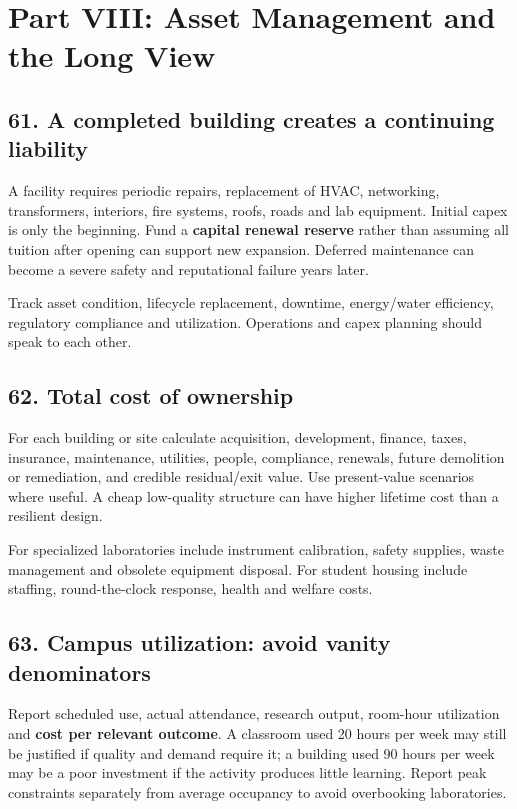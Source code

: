 \section*{Part VIII: Asset Management and the Long View}


\subsection{61. A completed building creates a continuing liability}

A facility requires periodic repairs, replacement of HVAC, networking, transformers, interiors, fire systems, roofs, roads and lab equipment. Initial capex is only the beginning. Fund a \textbf{capital renewal reserve} rather than assuming all tuition after opening can support new expansion. Deferred maintenance can become a severe safety and reputational failure years later.

Track asset condition, lifecycle replacement, downtime, energy/water efficiency, regulatory compliance and utilization. Operations and capex planning should speak to each other.


\subsection{62. Total cost of ownership}

For each building or site calculate acquisition, development, finance, taxes, insurance, maintenance, utilities, people, compliance, renewals, future demolition or remediation, and credible residual/exit value. Use present-value scenarios where useful. A cheap low-quality structure can have higher lifetime cost than a resilient design.

For specialized laboratories include instrument calibration, safety supplies, waste management and obsolete equipment disposal. For student housing include staffing, round-the-clock response, health and welfare costs.


\subsection{63. Campus utilization: avoid vanity denominators}

Report scheduled use, actual attendance, research output, room-hour utilization and \textbf{cost per relevant outcome}. A classroom used 20 hours per week may still be justified if quality and demand require it; a building used 90 hours per week may be a poor investment if the activity produces little learning. Report peak constraints separately from average occupancy to avoid overbooking laboratories.


